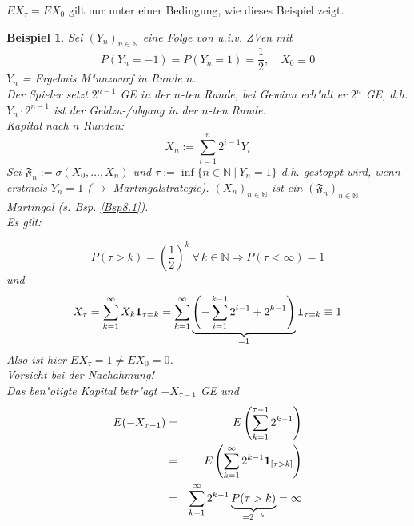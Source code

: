 \documentclass[a4paper,11pt]{book}
\newcommand{\N}{{\mathbb N}}
\newcommand{\ind}{\text{\bf{1}}}
\def\FF{ \mathfrak{F} }
\newtheorem{Bsp}{Beispiel}[chapter]
\theoremstyle{nonumberplain}
\begin{document}
$EX_{\tau} = EX_0$ gilt nur unter einer Bedingung, wie dieses Beispiel zeigt.

\begin{Bsp} \label{Bsp8.6}
Sei $(Y_n)_{n \in \N}$ eine Folge von u.i.v. ZVen mit
\[
P(Y_n = -1) = P(Y_n = 1) = \frac12, \quad X_0 \equiv 0
\]
$Y_n$ = Ergebnis M"unzwurf in Runde $n$.\\
Der Spieler setzt $2^{n-1}$ GE in der $n$-ten Runde, bei Gewinn erh"alt er $2^n$ GE, d.h. $Y_n \cdot 2^{n-1}$ ist der Geldzu-/abgang in der $n$-ten Runde.\\
Kapital nach $n$ Runden:
\[
X_n := \sum_{i=1}^n 2^{i-1}Y_i
\]
Sei $\FF_n := \sigma(X_0,\dots,X_n)$ und $\tau := \inf\{n \in \N\ |\ Y_n = 1\}$ d.h. gestoppt wird, wenn erstmals $Y_n = 1$ ($\rightarrow$ Martingalstrategie). $(X_n)_{n \in \N}$ ist ein $(\FF_n)_{n \in \N}$-Martingal (s. Bsp. \ref{Bsp8.1}).\\
Es gilt:

\[
P(\tau > k) = \left( \frac12 \right)^k \ \forall\, k \in \N \Rightarrow P(\tau < \infty) = 1
\]
und
\[
X_{\tau} = \sum_{k=1}^{\infty} X_k \ind_{\tau = k} = \sum_{k=1}^{\infty} \underbrace{\left( - \sum_{i=1}^{k-1} 2^{i-1} + 2^{k-1} \right)}_{= 1} \ind_{\tau = k} \equiv 1
\]
Also ist hier $EX_{\tau} = 1 \not= EX_0 = 0$.\\
Vorsicht  bei der Nachahmung!\\
Das ben"otigte Kapital betr"agt $-X_{\tau-1}$ GE und
\begin{eqnarray*}
E(-X_{\tau-1}) & = & E \left( \sum_{k=1}^{\tau-1} 2^{k-1} \right) \\
& = & E \left( \sum_{k=1}^{\infty} 2^{k-1} \ind_{[\tau > k]} \right) \\
& = & \sum_{k=1}^{\infty} 2^{k-1} \underbrace{P(\tau > k)}_{= 2^{-k}} = \infty
\end{eqnarray*}
\end{Bsp}
\end{document}
